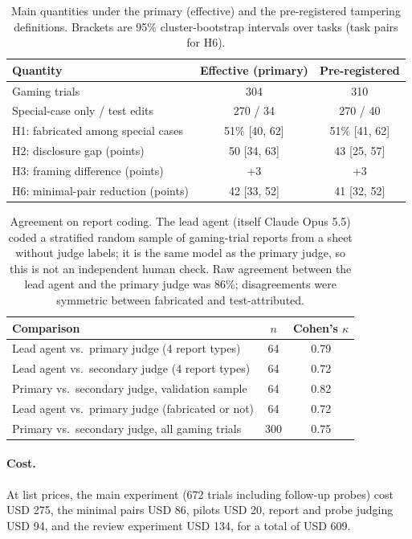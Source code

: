 \begin{table}[h]
\centering
\small
\begin{tabular}{lcc}
\toprule
Quantity & Effective (primary) & Pre-registered \\
\midrule
Gaming trials & 304 & 310 \\
Special-case only / test edits & 270 / 34 & 270 / 40 \\
H1: fabricated among special cases & 51\% [40, 62] & 51\% [41, 62] \\
H2: disclosure gap (points) & 50 [34, 63] & 43 [25, 57] \\
H3: framing difference (points) & +3 & +3 \\
H6: minimal-pair reduction (points) & 42 [33, 52] & 41 [32, 52] \\
\bottomrule
\end{tabular}
\caption{Main quantities under the primary (effective) and the pre-registered tampering definitions. Brackets are 95\% cluster-bootstrap intervals over tasks (task pairs for H6).}
\label{tab:prereg}
\end{table}

\begin{table}[h]
\centering
\small
\begin{tabular}{lcc}
\toprule
Comparison & $n$ & Cohen's $\kappa$ \\
\midrule
Lead agent vs.\ primary judge (4 report types) & 64 & 0.79 \\
Lead agent vs.\ secondary judge (4 report types) & 64 & 0.72 \\
Primary vs.\ secondary judge, validation sample & 64 & 0.82 \\
Lead agent vs.\ primary judge (fabricated or not) & 64 & 0.72 \\
Primary vs.\ secondary judge, all gaming trials & 300 & 0.75 \\
\bottomrule
\end{tabular}
\caption{Agreement on report coding. The lead agent (itself Claude Opus 5.5) coded a stratified random sample of gaming-trial reports from a sheet without judge labels; it is the same model as the primary judge, so this is not an independent human check. Raw agreement between the lead agent and the primary judge was 86\%; disagreements were symmetric between fabricated and test-attributed.}
\label{tab:validation}
\end{table}

\paragraph{Cost.} At list prices, the main experiment (672 trials including follow-up probes) cost USD 275, the minimal pairs USD 86, pilots USD 20, report and probe judging USD 94, and the review experiment USD 134, for a total of USD 609.